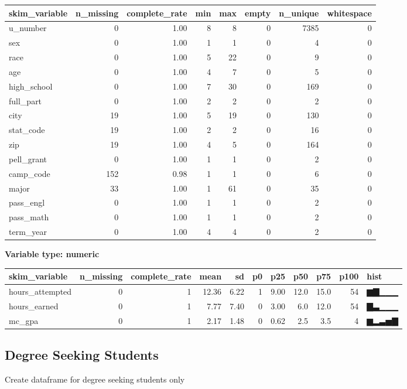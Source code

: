 \documentclass[]{article}
\newenvironment{Shaded}{\begin{snugshade}}{\end{snugshade}}
\newcommand{\CommentTok}[1]{\textcolor[rgb]{0.56,0.35,0.01}{\textit{#1}}}
\newcommand{\KeywordTok}[1]{\textcolor[rgb]{0.13,0.29,0.53}{\textbf{#1}}}
\newcommand{\NormalTok}[1]{#1}
\newcommand{\OperatorTok}[1]{\textcolor[rgb]{0.81,0.36,0.00}{\textbf{#1}}}
\newcommand{\StringTok}[1]{\textcolor[rgb]{0.31,0.60,0.02}{#1}}
\begin{document}
\begin{longtable}[]{@{}lrrrrrrr@{}}
\toprule
skim\_variable & n\_missing & complete\_rate & min & max & empty &
n\_unique & whitespace\tabularnewline
\midrule
\endhead
u\_number & 0 & 1.00 & 8 & 8 & 0 & 7385 & 0\tabularnewline
sex & 0 & 1.00 & 1 & 1 & 0 & 4 & 0\tabularnewline
race & 0 & 1.00 & 5 & 22 & 0 & 9 & 0\tabularnewline
age & 0 & 1.00 & 4 & 7 & 0 & 5 & 0\tabularnewline
high\_school & 0 & 1.00 & 7 & 30 & 0 & 169 & 0\tabularnewline
full\_part & 0 & 1.00 & 2 & 2 & 0 & 2 & 0\tabularnewline
city & 19 & 1.00 & 5 & 19 & 0 & 130 & 0\tabularnewline
stat\_code & 19 & 1.00 & 2 & 2 & 0 & 16 & 0\tabularnewline
zip & 19 & 1.00 & 4 & 5 & 0 & 164 & 0\tabularnewline
pell\_grant & 0 & 1.00 & 1 & 1 & 0 & 2 & 0\tabularnewline
camp\_code & 152 & 0.98 & 1 & 1 & 0 & 6 & 0\tabularnewline
major & 33 & 1.00 & 1 & 61 & 0 & 35 & 0\tabularnewline
pass\_engl & 0 & 1.00 & 1 & 1 & 0 & 2 & 0\tabularnewline
pass\_math & 0 & 1.00 & 1 & 1 & 0 & 2 & 0\tabularnewline
term\_year & 0 & 1.00 & 4 & 4 & 0 & 2 & 0\tabularnewline
\bottomrule
\end{longtable}

\textbf{Variable type: numeric}

\begin{longtable}[]{@{}lrrrrrrrrrl@{}}
\toprule
skim\_variable & n\_missing & complete\_rate & mean & sd & p0 & p25 &
p50 & p75 & p100 & hist\tabularnewline
\midrule
\endhead
hours\_attempted & 0 & 1 & 12.36 & 6.22 & 1 & 9.00 & 12.0 & 15.0 & 54 &
▆▇▁▁▁\tabularnewline
hours\_earned & 0 & 1 & 7.77 & 7.40 & 0 & 3.00 & 6.0 & 12.0 & 54 &
▇▃▁▁▁\tabularnewline
mc\_gpa & 0 & 1 & 2.17 & 1.48 & 0 & 0.62 & 2.5 & 3.5 & 4 &
▆▂▃▅▇\tabularnewline
\bottomrule
\end{longtable}

\hypertarget{degree-seeking-students}{%
\subsection{Degree Seeking Students}\label{degree-seeking-students}}

Create dataframe for degree seeking students only

\begin{Shaded}
\end{Shaded}
\end{document}
